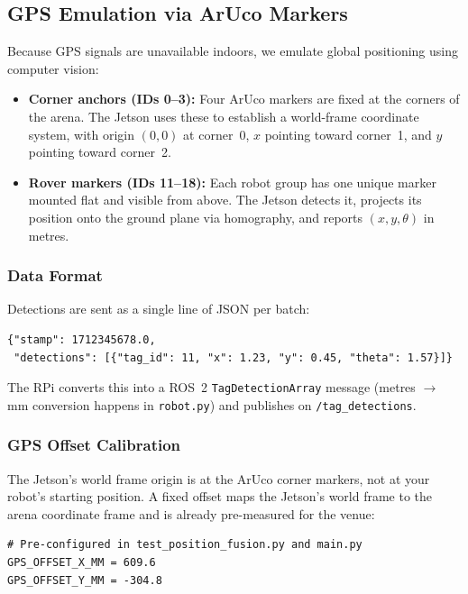 \documentclass[12pt,letterpaper]{article}
\begin{document}
\subsection{GPS Emulation via ArUco Markers}
\label{sec:gps-emulation}

Because GPS signals are unavailable indoors, we emulate global positioning
using computer vision:

\begin{itemize}
  \item \textbf{Corner anchors (IDs 0--3):} Four ArUco markers are fixed at
        the corners of the arena. The Jetson uses these to establish a
        world-frame coordinate system, with origin $(0, 0)$ at corner~0,
        $x$ pointing toward corner~1, and $y$ pointing toward corner~2.

  \item \textbf{Rover markers (IDs 11--18):} Each robot group has one unique
        marker mounted flat and visible from above.
        The Jetson detects it, projects its position onto the ground plane via
        homography, and reports $(x, y, \theta)$ in metres.
\end{itemize}

\subsubsection*{Data Format}

Detections are sent as a single line of JSON per batch:
\begin{lstlisting}[style=json, caption={GPS message format (one line per batch)}]
{"stamp": 1712345678.0,
 "detections": [{"tag_id": 11, "x": 1.23, "y": 0.45, "theta": 1.57}]}
\end{lstlisting}

The RPi converts this into a ROS~2 \texttt{TagDetectionArray} message
(metres $\to$ mm conversion happens in \texttt{robot.py}) and publishes on
\texttt{/tag\_detections}.

\subsubsection*{GPS Offset Calibration}

The Jetson's world frame origin is at the ArUco corner markers, not at
your robot's starting position.
A fixed offset maps the Jetson's world frame to the arena coordinate frame
and is already pre-measured for the venue:

\begin{lstlisting}[style=python]
# Pre-configured in test_position_fusion.py and main.py
GPS_OFFSET_X_MM = 609.6
GPS_OFFSET_Y_MM = -304.8
\end{lstlisting}
\end{document}
